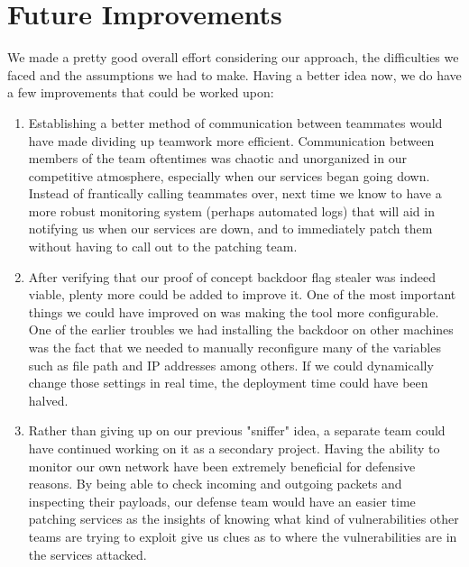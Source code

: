 \documentclass[12pt]{report}
\begin{document}
\section*{Future Improvements}
We made a pretty good overall effort considering our approach, the difficulties we faced and the assumptions we had to make. Having a better idea now, we do have a few improvements that could be worked upon:
\begin{enumerate}
	\item Establishing a better method of communication between teammates would have made dividing up teamwork more efficient. Communication between members of the team oftentimes was chaotic and unorganized in our competitive atmosphere, especially when our services began going down. Instead of frantically calling teammates over, next time we know to have a more robust monitoring system (perhaps automated logs) that will aid in notifying us when our services are down, and to immediately patch them without having to call out to the patching team.
	\item After verifying that our proof of concept backdoor flag stealer was indeed viable, plenty more could be added to improve it. One of the most important things we could have improved on was making the tool more configurable. One of the earlier troubles we had installing the backdoor on other machines was the fact that we needed to manually reconfigure many of the variables such as file path and IP addresses among others. If we could dynamically change those settings in real time, the deployment time could have been halved.
	\item Rather than giving up on our previous "sniffer" idea, a separate team could have continued working on it as a secondary project. Having the ability to monitor our own network have been extremely beneficial for defensive reasons. By being able to check incoming and outgoing packets and inspecting their payloads, our defense team would have an easier time patching services as the insights of knowing what kind of vulnerabilities other teams are trying to exploit give us clues as to where the vulnerabilities are in the services attacked.
\end{enumerate}	
	
\end{document}
